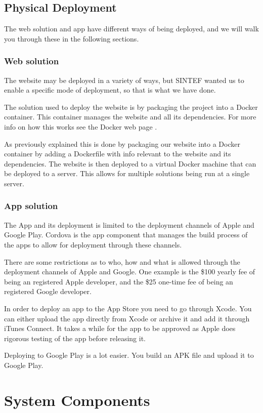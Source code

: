 \subsection{Physical Deployment}

The web solution and app have different ways of being deployed, and we will walk you through these in the following sections.
\subsubsection{Web solution}
The website may be deployed in a variety of ways, but SINTEF wanted us to enable a specific mode of deployment, so that is what we have done.

The solution used to deploy the website is by packaging the project into a Docker container. This container manages the website and all its dependencies. For more info on how this works see the Docker web page \cite{docker}.

As previously explained this is done by packaging our website into a Docker container by adding a Dockerfile with info relevant to the website and its dependencies. The website is then deployed to a virtual Docker machine that can be deployed to a server. This allows for multiple solutions being run at a single server.

\subsubsection{App solution}
The App and its deployment is limited to the deployment channels of Apple and Google Play. Cordova is the app component that manages the build process of the apps to allow for deployment through these channels.

There are some restrictions as to who, how and what is allowed through the deployment channels of Apple and Google. One example is the \$100 yearly fee of being an registered Apple developer, and the \$25 one-time fee of being an registered Google developer.

In order to deploy an app to the App Store you need to go through Xcode. You can either upload the app directly from Xcode or archive it and add it through iTunes Connect. It takes a while for the app to be approved as Apple does rigorous testing of the app before releasing it.

Deploying to Google Play is a lot easier. You build an APK file and upload it to Google Play.
\section{System Components}
